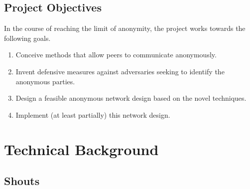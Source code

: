 \documentclass[ %
                    author={Luke Murray},
                supervisor={Dr. Simon Hollis},
                     title={Shadow Peer-to-Peer Networks},
                  subtitle={},
                    degree={MEng},
                      year={2013} ]{thesis}
\begin{document}
\section{Project Objectives}

In the course of reaching the limit of anonymity, the project works towards the following goals. 

\begin{enumerate}
\item Conceive methods that allow peers to communicate anonymously.
\item Invent defensive measures against adversaries seeking to identify the anonymous parties.
\item Design a feasible anonymous network design based on the novel techniques.
\item Implement (at least partially) this network design.
\end{enumerate}


\chapter{Technical Background}
\label{chap:technical}

\section{Shouts}
\end{document}

